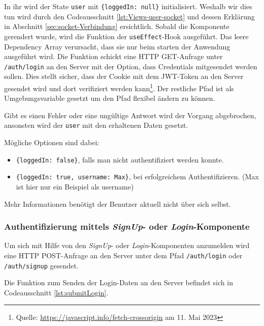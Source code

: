 In ihr wird der State \verb|user| mit \verb|{loggedIn: null}| initialisiert. Weshalb wir dies tun wird durch den Codeausschnitt \ref{lst:Views-user-socket} und dessen Erklärung in Abschnitt \ref{sec:socket-Verbindung} ersichtlich. Sobald die Komponente gerendert wurde, wird die Funktion der \verb|useEffect|-Hook ausgeführt. Das leere Dependency Array verursacht, dass sie nur beim starten der Anwendung ausgeführt wird. Die Funktion schickt eine HTTP GET-Anfrage unter \verb|/auth/login| an den Server mit der Option, dass Credentials mitgesendet werden sollen. Dies stellt sicher, dass der Cookie mit dem JWT-Token an den Server gesendet wird und dort verifiziert werden kann\footnote{Quelle: \url{https://javascript.info/fetch-crossorigin} am 11. Mai 2023}. Der restliche Pfad ist als Umgebungsvariable gesetzt um den Pfad flexibel ändern zu können.

Gibt es einen Fehler oder eine ungültige Antwort wird der Vorgang abgebrochen, ansonsten wird der \verb|user| mit den erhaltenen Daten gesetzt.

Mögliche Optionen sind dabei:
\begin{itemize}
\item \verb|{loggedIn: false}|, falls man nicht authentifiziert werden konnte.
\item \verb|{loggedIn: true, username: Max}|, bei erfolgreichem Authentifizieren. (Max ist hier nur ein Beispiel als username)
\end{itemize}
Mehr Informationen benötigt der Benutzer aktuell nicht über sich selbst.

\subsubsection{Authentifizierung mittels \textit{SignUp}- oder \textit{Login}-Komponente}
Um sich mit Hilfe von den \textit{SignUp}- oder \textit{Login}-Komponenten anzumelden wird eine HTTP POST-Anfrage an den Server unter dem Pfad \verb|/auth/login| oder \verb|/auth/signup| gesendet.

Die Funktion zum Senden der Login-Daten an den Server befindet sich in Codeausschnitt \ref{lst:submitLogin}.

